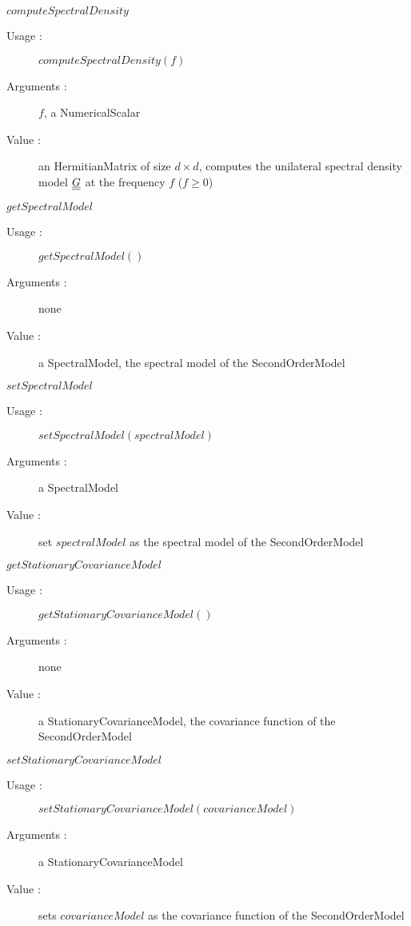 \begin{description}
   \item $computeSpectralDensity$
    \begin{description}
    \item[Usage :] $computeSpectralDensity(f)$
    \item[Arguments :] $f$,  a NumericalScalar
    \item[Value :] an HermitianMatrix of size $d \times d$, computes the unilateral spectral density model ${\underline{\underline{G}}}$ at the frequency $f$ ($f \geq 0$)
    \end{description}
    \bigskip

  \item $getSpectralModel$
    \begin{description}
    \item[Usage :] $getSpectralModel()$
    \item[Arguments :] none
    \item[Value :] a SpectralModel, the spectral model of the SecondOrderModel
    \end{description}
    \bigskip

  \item $setSpectralModel$
    \begin{description}
    \item[Usage :] $setSpectralModel(spectralModel)$
    \item[Arguments :] a SpectralModel
    \item[Value :] set $spectralModel$ as the spectral model  of the SecondOrderModel
    \end{description}
    \bigskip

  \item $getStationaryCovarianceModel$
    \begin{description}
    \item[Usage :] $getStationaryCovarianceModel()$
    \item[Arguments :] none
    \item[Value :] a StationaryCovarianceModel, the covariance function of the SecondOrderModel
    \end{description}
    \bigskip

  \item $setStationaryCovarianceModel$
    \begin{description}
    \item[Usage :] $setStationaryCovarianceModel(covarianceModel)$
    \item[Arguments :] a StationaryCovarianceModel
    \item[Value :] sets $covarianceModel$ as the covariance function of the SecondOrderModel
    \end{description}
    \bigskip


\end{description}
